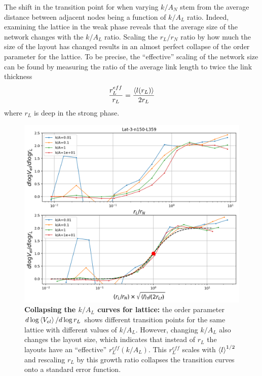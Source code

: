 \documentclass[12pt]{article}%
\begin{document}

The shift in the transition point for when varying $k/A_N$ stem from the average distance between adjacent nodes being a function of $k/A_L$ ratio.
Indeed, examining the lattice in the weak phase reveals that the average size of the network changes with the $k/A_L$ ratio. 
Scaling the $r_L/r_N$ ratio by how much the size of the layout has changed results in an almost perfect collapse of the order parameter for the lattice. 
To be precise, the ``effective'' scaling of the network size can be found by measuring the ratio of the average link length to twice the link thickness 
\[{r_L^{eff}\over r_L} = {\left<l(r_L)\right>\over 2 r_L}\]
where $r_L$ is deep in the strong phase. 
\begin{figure}
    \centering
    \includegraphics[width=.7\textwidth]{fig-09-19/Lat-kA-scaled-fit.png}
    \caption{\scriptsize {\bf Collapsing the $k/A_L$ curves for lattice:} the order parameter $d\log \left<V_{el}\right> /d \log r_L $ shows different transition points for the same lattice with different values of $k/A_L$.
    However, changing $k/A_L$ also changes the layout size, which indicates that instead of $r_L$ the layouts have an ``effective'' $r_L^{eff}(k/A_L)$.  
    This $r_L^{eff}$ scales with $\left<l\right>^{1/2}$ and rescaling $r_L$ by this growth ratio collapses the transition curves onto a standard error function.}
    \label{fig:l-kA-lat}
\end{figure}
\end{document}
